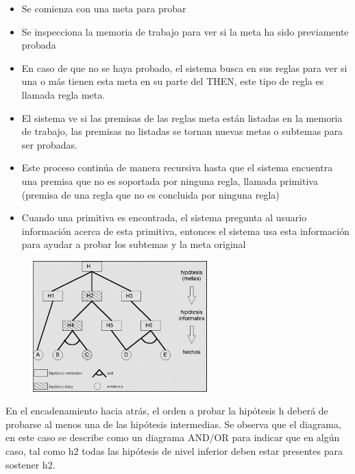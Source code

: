 \documentclass[12 pt, a4paper]{article}
\begin{document}
			\begin{itemize}
				\item Se comienza con una meta para probar\\
				\item Se inspecciona la memoria de trabajo para ver si la meta ha sido     previamente probada\\
				\item En caso de que no se haya probado, el sistema busca en sus reglas para ver si     una o más tienen esta meta en su parte del THEN, este tipo de regla     es llamada regla meta.\\
				\item El sistema ve si las premisas de las reglas meta están listadas en la memoria     de trabajo, las premisas no listadas se tornan nuevas metas o     subtemas para ser probadas.\\
				\item Este proceso continúa de manera recursiva hasta que el sistema encuentra una     premisa que no es soportada por ninguna regla, llamada primitiva     (premisa de una regla que no es concluida por ninguna regla)\\
				\item Cuando una primitiva es encontrada, el sistema pregunta al usuario información     acerca de esta primitiva, entonces el sistema usa esta información     para ayudar a probar los subtemas y la meta original\\
			\end{itemize}	
				\begin{figure}[h]
					\centering
					\includegraphics[width=0.6\textwidth]{./section2/fig8.png}
				\end{figure}
			
			En el encadenamiento hacia atrás, el orden a probar la hipótesis h deberá de probarse al menos una de las hipótesis intermedias. Se observa que el diagrama, en este caso se describe como un diagrama AND/OR para indicar que en algún caso, tal como h2 todas las hipótesis de nivel inferior deben estar presentes para sostener h2.
	
\end{document}
